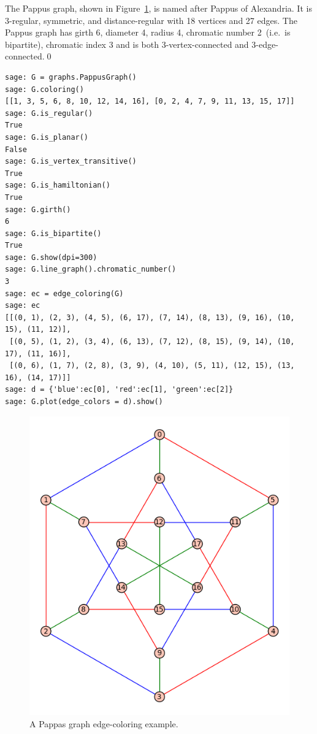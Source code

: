 \begin{example}
\label{eg:graph_coloring:pappas_graph_edge_coloring_example}
\rm
The Pappus graph, shown in
Figure~\ref{fig:graph_coloring:pappas_graph_edge_coloring_example}, is
named after Pappus of Alexandria.  It is $3$-regular, symmetric, and
distance-regular with 18 vertices and 27 edges.  The Pappus graph has
girth 6, diameter 4, radius 4, chromatic number 2~(i.e.~is bipartite),
chromatic index 3 and is both 3-vertex-connected and
3-edge-connected.\qed
\end{example}

\begin{lstlisting}
sage: G = graphs.PappusGraph()
sage: G.coloring()
[[1, 3, 5, 6, 8, 10, 12, 14, 16], [0, 2, 4, 7, 9, 11, 13, 15, 17]]
sage: G.is_regular()
True
sage: G.is_planar()
False
sage: G.is_vertex_transitive()
True
sage: G.is_hamiltonian()
True
sage: G.girth()
6
sage: G.is_bipartite()
True
sage: G.show(dpi=300)
sage: G.line_graph().chromatic_number()
3
sage: ec = edge_coloring(G)
sage: ec
[[(0, 1), (2, 3), (4, 5), (6, 17), (7, 14), (8, 13), (9, 16), (10, 15), (11, 12)],
 [(0, 5), (1, 2), (3, 4), (6, 13), (7, 12), (8, 15), (9, 14), (10, 17), (11, 16)],
 [(0, 6), (1, 7), (2, 8), (3, 9), (4, 10), (5, 11), (12, 15), (13, 16), (14, 17)]]
sage: d = {'blue':ec[0], 'red':ec[1], 'green':ec[2]}
sage: G.plot(edge_colors = d).show()
\end{lstlisting}

\begin{figure}[!htbp]
\centering
{}
\includegraphics[scale=0.7]{image/graph-coloring/pappas-graph-edge-coloring-example}
\caption{A Pappas graph edge-coloring example.}
\label{fig:graph_coloring:pappas_graph_edge_coloring_example}
\end{figure}

